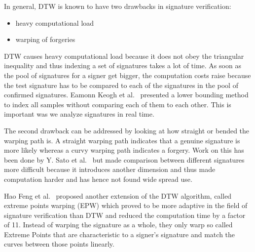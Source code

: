 \documentclass[a4paper, oneside]{csthesis}
\begin{document}
In general, DTW is known to have two drawbacks in signature verification:
\begin{itemize}
\item heavy computational load
\item warping of forgeries
\end{itemize}

DTW causes heavy computational load because it does not obey the triangular inequality and thus indexing a set of signatures takes a lot of time. As soon as the pool of signatures for a signer get bigger, the computation costs raise because the test signature has to be compared to each of the signatures in the pool of confirmed signatures. Eamonn Keogh et al.~\cite{Keogh:2002:EID:1287369.1287405} presented a lower bounding method to index all samples without comparing each of them to each other. This is important was we analyze signatures in real time.

The second drawback can be addressed by looking at how straight or bended the warping path is. A straight warping path indicates that a genuine signature is more likely whereas a curvy warping path indicates a forgery. Work on this has been done by Y. Sato et al.~\cite{Sato1982} but made comparison between different signatures more difficult because it introduces another dimension and thus made computation harder and has hence not found wide spread use.

Hao Feng et al.~\cite{Feng:2003:OSV:961320.961331} proposed another extension of the DTW algorithm, called extreme points warping (EPW) which proved to be more adaptive in the field of signature verification than DTW and reduced the computation time by a factor of 11.  Instead of warping the signature as a whole, they only warp so called Extreme Points that are characteristic to a signer's signature and match the curves between those points linearly.




\end{document}
